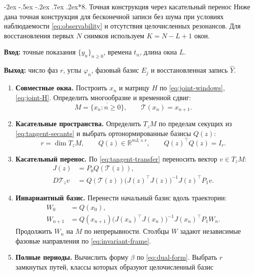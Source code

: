 \documentclass[11pt,a4paper]{article}
\makeatletter
\renewcommand\section{\@startsection{section}{1}{\z@}%
  {-2ex \@plus -.5ex \@minus -.2ex}%
  {.7ex \@plus .2ex}{\normalfont\Large\bfseries}}
\makeatother
\begin{document}
\noindent\begin{minipage}{\textwidth}
\section*{8. Точная конструкция через касательный перенос}
Ниже дана точная конструкция для бесконечной записи без шума
при условиях наблюдаемости \eqref{eq:observability} и отсутствия целочисленных резонансов.
Для восстановления первых $N$ снимков используем $K=N-L+1$ окон.

\begin{algorithm}[H]
\caption{Фазовая реконструкция по переносу совместных окон}
\label{alg:phase-transfer}
\small
\textbf{Вход:} точные показания $\{y_n\}_{n\ge0}$, времена $t_n$, длина окна $L$.\par
\textbf{Выход:} число фаз $r$, углы $\varphi_n$, фазовый базис $E_j$
и восстановленная запись $\widehat Y$.
\begin{enumerate}
\setlength{\itemsep}{4pt}
\setlength{\parskip}{0pt}
\item \textbf{Совместные окна.} Построить $x_n$ и матрицу $H$ по \eqref{eq:joint-windows}, \eqref{eq:joint-H}.
Определить многообразие и временной сдвиг:
$$
M=\overline{\{x_n:n\ge0\}},\qquad \mathcal T(x_n)=x_{n+1}.
$$
\item \textbf{Касательные пространства.} Определить $T_zM$ по пределам секущих
из \eqref{eq:tangent-secants} и выбрать
ортонормированные базисы $Q(z)$:
$$
r=\dim T_zM,\qquad Q(z)\in\mathbb R^{mL\times r},\qquad Q(z)^\top Q(z)=I_r.
$$
\item \textbf{Касательный перенос.} По \eqref{eq:tangent-transfer} переносить вектор $v\in T_zM$:
$$
\begin{aligned}
J(z)&=P_0Q(\mathcal T(z)),\\
D\mathcal T_zv&=Q(\mathcal T(z))
\bigl(J(z)^\top J(z)\bigr)^{-1}J(z)^\top P_1v.
\end{aligned}
$$
\item \textbf{Инвариантный базис.} Перенести начальный базис вдоль траектории:
$$
\begin{aligned}
W_0&=Q(x_0),\\
W_{n+1}&=Q(x_{n+1})
\bigl(J(x_n)^\top J(x_n)\bigr)^{-1}J(x_n)^\top P_1W_n.
\end{aligned}
$$
Продолжить $W_n$ на $M$ по непрерывности.
Столбцы $W$ задают независимые фазовые направления по \eqref{eq:invariant-frame}.
\item \textbf{Полные периоды.} Вычислить форму $\beta$ по \eqref{eq:dual-form}.
Выбрать $r$ замкнутых путей, классы которых образуют целочисленный базис

\end{enumerate}
\end{algorithm}
\end{minipage}
\end{document}
